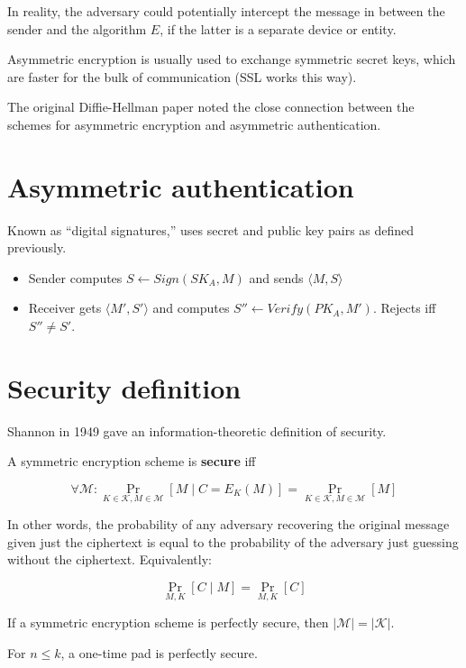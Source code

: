 \documentclass[12pt]{article}
\begin{document}
In reality, the adversary could potentially intercept the message
in between the sender and the algorithm $E$, if the latter is a separate
device or entity.

Asymmetric encryption is usually used to exchange symmetric secret keys,
which are faster for the bulk of communication (SSL works this way).

The original Diffie-Hellman paper
noted the close connection between the schemes for
asymmetric encryption and asymmetric authentication.

\section{Asymmetric authentication}

Known as ``digital signatures,'' uses secret and public key pairs as
defined previously.

\begin{itemize}
\item Sender computes $S \gets Sign(SK_A, M)$ and sends $\langle M, S \rangle$
\item Receiver gets $\langle M', S' \rangle$ and computes $S'' \gets Verify(PK_A, M')$. Rejects iff $S'' \ne S'$.
\end{itemize}

\section{Security definition}

Shannon in 1949 gave an information-theoretic definition of security.

\begin{definition}
A symmetric encryption scheme is \textbf{secure} iff

\begin{displaymath}
\forall \mathcal{M}: \Pr_{K \in \mathcal{K}, M \in \mathcal{M}}{\left[M \mid C=E_K(M)  \right]} = \Pr_{K \in \mathcal{K}, M \in \mathcal{M}}{\left[M\right]}
\end{displaymath}

In other words, the probability of any adversary recovering the original
message given just the ciphertext is equal to the probability of the
adversary just guessing without the ciphertext. Equivalently:

\begin{displaymath}
\Pr_{M,K}{\left[ C \mid M \right]} = \Pr_{M,K}{\left[C\right]}
\end{displaymath}
\end{definition}

\begin{theorem}
If  a symmetric encryption scheme is perfectly secure, then $|\mathcal{M}| = |\mathcal{K}|$.
\end{theorem}

\begin{theorem}
For $n \le k$, a one-time pad is perfectly secure.
\end{theorem}
\end{document}

